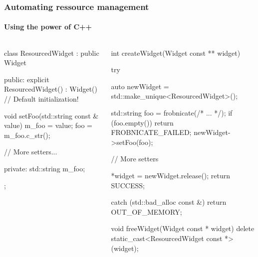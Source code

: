\documentclass{beamer}
\begin{document}
\begin{frame}[fragile]
\frametitle{Automating ressource management}
\framesubtitle{Using the power of C++}
\begin{columns}
\begin{column}{0.45\textwidth}
\pause
\begin{TinyC++}
class ResourcedWidget : public Widget
{
public:
	explicit ResourcedWidget()
        : Widget()	// Default initialization!
	{}

	void setFoo(std::string const & value)
	{
		m_foo = value;
		foo = m_foo.c_str();
	}

	// More setters...
	
private:
	std::string m_foo;
};
\end{TinyC++}
\end{column}
\pause
\begin{column}{0.45\textwidth}
\begin{TinyC++}
int createWidget(Widget const ** widget)
{
	try	{
		auto newWidget = std::make_unique<ResourcedWidget>();
    
		std::string	foo = frobnicate(/* ... */);
		if (foo.empty())
		{
			return FROBNICATE_FAILED;
		}
		newWidget->setFoo(foo);

		// More setters
    
		*widget = newWidget.release();
		return SUCCESS;
	}
	catch (std::bad_alloc const &)	{
		return OUT_OF_MEMORY;
	}
}
\end{TinyC++}
\pause
\begin{TinyC++}
void freeWidget(Widget const * widget)
{
	delete static_cast<ResourcedWidget const *>(widget);
}
\end{TinyC++}
\end{column}
\end{columns}
\end{frame}

\end{document}
